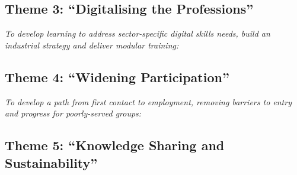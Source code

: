 \documentclass[conference]{IEEEtran}
\begin{document}
\subsection*{Theme 3: ``Digitalising the Professions''}

{\emph{To develop learning to address sector-specific digital skills
needs, build an industrial strategy and deliver modular
training:}}


\subsection*{Theme 4: ``Widening Participation''}

{\emph{To develop a path from first contact to employment, removing
barriers to entry and progress for poorly-served groups:}}


\subsection*{Theme 5: ``Knowledge Sharing and Sustainability''}
\end{document}
